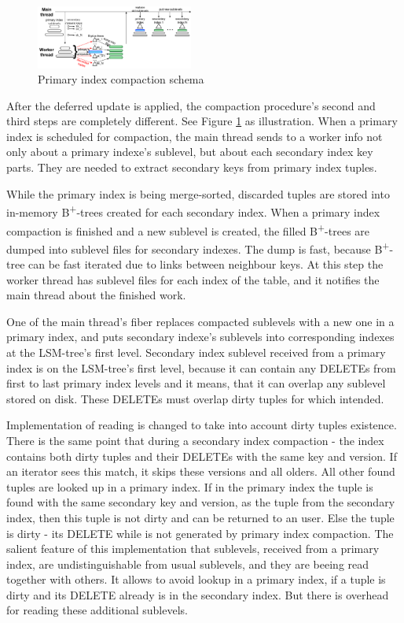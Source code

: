 \documentclass{vldb}
\begin{document}
\begin{figure}
\centering
\includegraphics[width=0.46\textwidth]{compaction_implementation}
\caption{Primary index compaction schema}
\label{fig:compaction_implementation}
\end{figure}
After the deferred update is applied, the compaction procedure's second and
third steps are completely different. See Figure
\ref{fig:compaction_implementation} as illustration. When a primary index is
scheduled for compaction, the main thread sends to a worker info not only about
a primary indexe's sublevel, but about each secondary index key parts. They are
needed to extract secondary keys from primary index tuples.

While the primary index is being merge-sorted, discarded tuples are stored into
in-memory B\textsuperscript{+}-trees created for each secondary index. When a
primary index compaction is finished and a new sublevel is created, the filled
B\textsuperscript{+}-trees are dumped into sublevel files for secondary indexes.
The dump is fast, because B\textsuperscript{+}-tree can be fast iterated due to
links between neighbour keys. At this step the worker thread has sublevel files
for each index of the table, and it notifies the main thread about the finished
work.

One of the main thread's fiber replaces compacted sublevels with a new one in a
primary index, and puts secondary indexe's sublevels into corresponding indexes
at the LSM-tree's first level. Secondary index sublevel received from a primary
index is on the LSM-tree's first level, because it can contain any DELETEs from
first to last primary index levels and it means, that it can overlap any
sublevel stored on disk. These DELETEs must overlap dirty tuples for which
intended.

Implementation of reading is changed to take into account dirty tuples
existence. There is the same point that during a secondary index compaction -
the index contains both dirty tuples and their DELETEs with the same key and
version. If an iterator sees this match, it skips these versions and all olders.
All other found tuples are looked up in a primary index. If in the primary index
the tuple is found with the same secondary key and version, as the tuple from
the secondary index, then this tuple is not dirty and can be returned to an
user. Else the tuple is dirty - its DELETE while is not generated by primary
index compaction. The salient feature of this implementation that sublevels,
received from a primary index, are undistinguishable from usual sublevels, and
they are beeing read together with others. It allows to avoid lookup in a
primary index, if a tuple is dirty and its DELETE already is in the secondary
index. But there is overhead for reading these additional sublevels.
\end{document}
